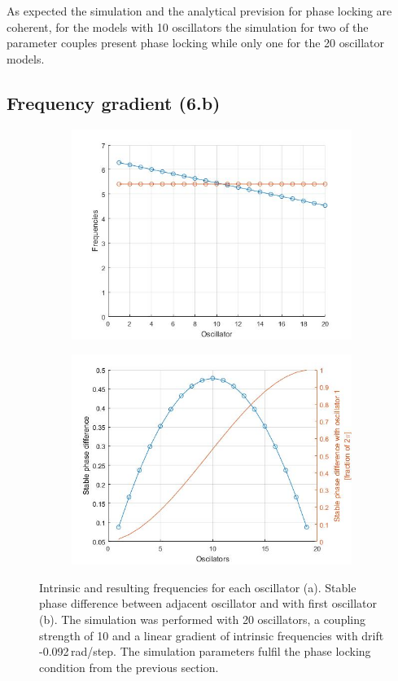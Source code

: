 \documentclass[a4paper]{scrartcl}
\begin{document}
As expected the simulation and the analytical prevision for phase locking are coherent, for the models with 10 oscillators the simulation for two of the parameter couples present phase locking while only one for the 20 oscillator models.

\subsection{Frequency gradient (6.b)}
\begin{figure}[h]
	\centering
	\begin{subfigure}[b]{0.49\textwidth}
		\centering
		\includegraphics[width=\textwidth]{results/6.b/propaWaveFreq.jpg}
		\caption{}
	\end{subfigure}
	\centering
	\begin{subfigure}[b]{0.49\textwidth}
		\centering
		\includegraphics[width=\textwidth]{results/6.b/propaWavePhase.jpg}
		\caption{}
	\end{subfigure}
	\caption{Intrinsic and resulting frequencies for each oscillator (a). Stable phase difference between adjacent oscillator and with first oscillator (b). The simulation was performed with 20 oscillators, a coupling strength of 10 and a linear gradient of intrinsic frequencies with drift -0.092\,rad/step. The simulation parameters fulfil the phase locking condition from the previous section.}\label{prop}
\end{figure}
\end{document}
